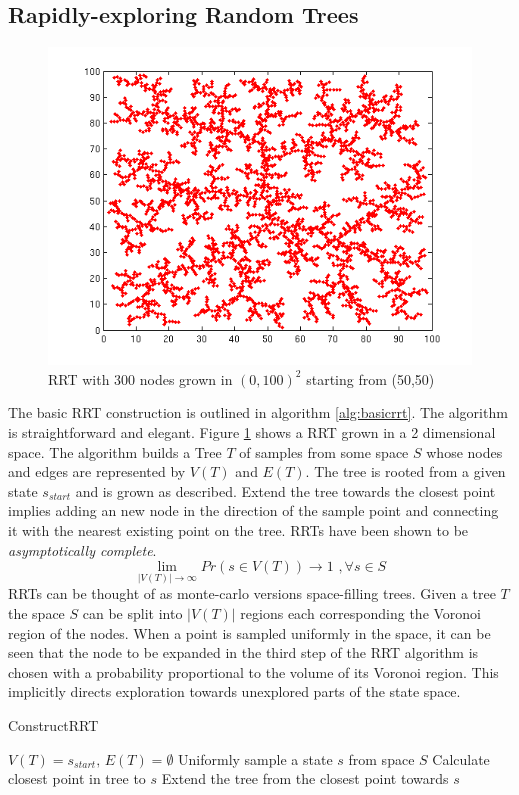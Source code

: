 \documentclass{article} %
\begin{document}
\subsection{Rapidly-exploring Random Trees}
\label{sec:rrt}
\begin{figure}[htb]
\centering
\label{fig:rrt}
\includegraphics[scale=0.45]{rrt.png}
\caption{RRT with 300 nodes grown in $(0,100)^2$ starting from (50,50)}
\end{figure}

The basic RRT construction is outlined in algorithm \ref{alg:basicrrt}. The algorithm is straightforward and elegant.  Figure \ref{fig:rrt} shows a RRT grown in a 2 dimensional space. The algorithm builds a Tree $T$ of samples from some space $S$ whose nodes and edges are represented by $V(T)$ and $E(T)$. The tree is rooted from a given state $s_{start}$ and is grown as described. Extend the tree towards the closest point implies adding an new node in the direction of the sample point and connecting it with the nearest existing point on the tree.   RRTs have been shown to be \textit{asymptotically complete}\cite{rrtconnect}. 
\[ \lim_{\mid V(T)\mid \rightarrow \infty } Pr(s\in V(T)) \rightarrow 1\,\,, \forall s\in S \] 
RRTs can be thought of as monte-carlo versions space-filling trees. Given a tree $T$ the space $S$ can be split into $|V(T)|$ regions each corresponding the Voronoi region of the nodes. When a point is sampled uniformly in the space, it can be seen that the node to be expanded in the third step of the RRT algorithm is chosen with a probability proportional to the volume of its Voronoi region. This implicitly directs exploration towards unexplored parts of the state space. 
\begin{algorithm}
\caption{ConstructRRT}
\label{alg:basicrrt}
\begin{algorithmic}
\State $V(T)=s_{start},\,E(T)=\emptyset$
\Repeat 
	\State Uniformly sample a state $s$ from space $S$
	\State Calculate closest point in tree to $s$
	\State Extend the tree from the closest point towards $s$ 
\end{algorithmic}
\end{algorithm}
\end{document}
